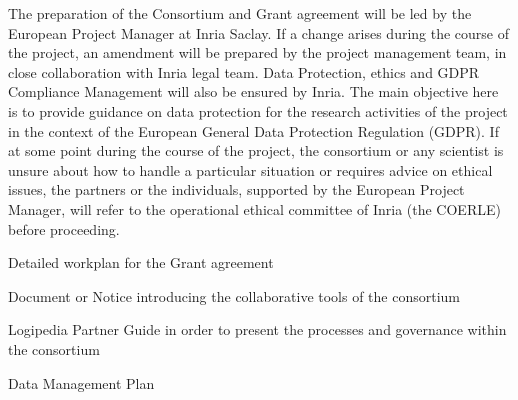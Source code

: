 \begin{workpackage}[id=management,type=MGT,wphases=1-48,
  short=Management,
  title=Management,
  lead=Inr,InrRM=34,InnRM=2,SacRM=2,TumRM=2,LieRM=2,BelRM=2,DelRM=2,FauRM=2]
\begin{tasklist}
  \begin{task}[id=legal,title={Legal Management (data, ethics, GDPR)},shorttitle={Legal},
      lead=Inr,InrRM=4,wphases=1-48]
    The preparation of the Consortium and Grant agreement will be led
    by the European Project Manager at Inria Saclay. If a change
    arises during the course of the project, an amendment will be
    prepared by the project management team, in close collaboration
    with Inria legal team.  Data Protection, ethics and GDPR
    Compliance Management will also be ensured by Inria. The main
    objective here is to provide guidance on data protection for the
    research activities of the project in the context of the European
    General Data Protection Regulation (GDPR). If at some point during
    the course of the project, the consortium or any scientist is
    unsure about how to handle a particular situation or requires
    advice on ethical issues, the partners or the individuals,
    supported by the European Project Manager, will refer to the operational ethical
    committee of Inria (the COERLE) before proceeding.
  \end{task}
\end{tasklist}




\begin{wpdelivs}
  \begin{wpdeliv}[due=2,id=workplan,dissem=PU,nature=R,lead=Inr,task=coordination]{Detailed workplan for the Grant agreement}\end{wpdeliv}

  \begin{wpdeliv}[due=2,id=collab-tools,dissem=PU,nature=R,lead=Inr,
task=coordination]{Document or Notice introducing the collaborative tools of the consortium}\end{wpdeliv}

  \begin{wpdeliv}[due=3,id=guide,dissem=PU,nature=R,lead=Inr,task=coordination]{Logipedia Partner Guide in order to present the processes and governance within the consortium}\end{wpdeliv}

  \begin{wpdeliv}[due=4,id=data-plan,dissem=PU,nature=R,lead=Inr,
task=coordination]{Data Management Plan}\end{wpdeliv}
\end{wpdelivs}

\end{workpackage}

